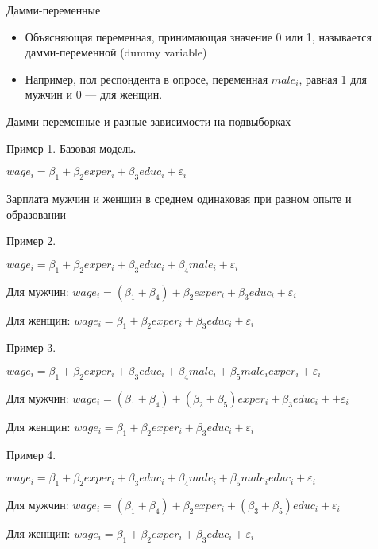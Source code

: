 \documentclass[ignorenonframetext,]{beamer}
\begin{document}
\begin{frame}{Дамми-переменные}

\begin{itemize}
\item
  Объясняющая переменная, принимающая значение 0 или 1, называется
  дамми-переменной (dummy variable)
\item
  Например, пол респондента в опросе, переменная \(male_i\), равная 1
  для мужчин и 0 --- для женщин.
\end{itemize}

\end{frame}

\begin{frame}{Дамми-переменные и разные зависимости на подвыборках}

Пример 1. Базовая модель.

\(wage_i = \beta_1 + \beta_2 exper_i + \beta_3 educ_i + \varepsilon_i\)

Зарплата мужчин и женщин в среднем одинаковая при равном опыте и
образовании

\end{frame}

\begin{frame}{Пример 2.}

\(wage_i = \beta_1 + \beta_2 exper_i + \beta_3 educ_i + \beta_4 male_i + \varepsilon_i\)

Для мужчин:
\(wage_i = (\beta_1+\beta_4) + \beta_2 exper_i + \beta_3 educ_i + \varepsilon_i\)

Для женщин:
\(wage_i = \beta_1 + \beta_2 exper_i + \beta_3 educ_i + \varepsilon_i\)

\end{frame}

\begin{frame}{Пример 3.}

\(wage_i = \beta_1 + \beta_2 exper_i + \beta_3 educ_i + \beta_4 male_i + \beta_5 male_i exper_i + \varepsilon_i\)

Для мужчин:
\(wage_i = (\beta_1+\beta_4) + (\beta_2+\beta_5) exper_i + \beta_3 educ_i + + \varepsilon_i\)

Для женщин:
\(wage_i = \beta_1 + \beta_2 exper_i + \beta_3 educ_i + \varepsilon_i\)

\end{frame}

\begin{frame}{Пример 4.}

\(wage_i = \beta_1 + \beta_2 exper_i + \beta_3 educ_i + \beta_4 male_i + \beta_5 male_i educ_i + \varepsilon_i\)

Для мужчин:
\(wage_i = (\beta_1+\beta_4) + \beta_2 exper_i + (\beta_3 + \beta_5) educ_i + \varepsilon_i\)

Для женщин:
\(wage_i = \beta_1 + \beta_2 exper_i + \beta_3 educ_i + \varepsilon_i\)

\end{frame}
\end{document}
